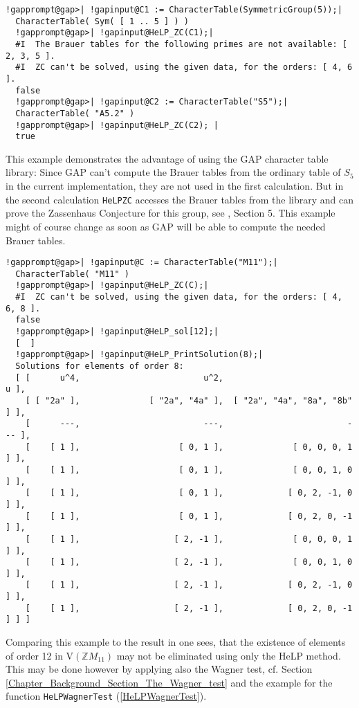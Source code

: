 \documentclass[a4paper,11pt]{report}
\begin{document}
{{\begin{Verbatim}[commandchars=!@|,fontsize=\small,frame=single,label=Example]
  !gapprompt@gap>| !gapinput@C1 := CharacterTable(SymmetricGroup(5));|
  CharacterTable( Sym( [ 1 .. 5 ] ) )
  !gapprompt@gap>| !gapinput@HeLP_ZC(C1);|
  #I  The Brauer tables for the following primes are not available: [ 2, 3, 5 ].
  #I  ZC can't be solved, using the given data, for the orders: [ 4, 6 ].
  false
  !gapprompt@gap>| !gapinput@C2 := CharacterTable("S5");|
  CharacterTable( "A5.2" )
  !gapprompt@gap>| !gapinput@HeLP_ZC(C2); |
  true
\end{Verbatim}
 This example demonstrates the advantage of using the GAP character table
library: Since GAP can't compute the Brauer tables from the ordinary table of $S_5$ in the current implementation, they are not used in the first calculation. But
in the second calculation \texttt{HeLP{\textunderscore}ZC} accesses the Brauer tables from the library and can prove the Zassenhaus
Conjecture for this group, see \cite{HertweckBrauer}, Section 5. This example might of course change as soon as GAP will be able
to compute the needed Brauer tables. 
\begin{Verbatim}[commandchars=!@|,fontsize=\small,frame=single,label=Example]
  !gapprompt@gap>| !gapinput@C := CharacterTable("M11");|
  CharacterTable( "M11" )
  !gapprompt@gap>| !gapinput@HeLP_ZC(C);|
  #I  ZC can't be solved, using the given data, for the orders: [ 4, 6, 8 ].
  false
  !gapprompt@gap>| !gapinput@HeLP_sol[12];|
  [  ]
  !gapprompt@gap>| !gapinput@HeLP_PrintSolution(8);|
  Solutions for elements of order 8:
  [ [      u^4,                         u^2,                           u ],
    [ [ "2a" ],              [ "2a", "4a" ],  [ "2a", "4a", "8a", "8b" ] ],
    [      ---,                         ---,                         --- ],
    [    [ 1 ],                    [ 0, 1 ],              [ 0, 0, 0, 1 ] ],
    [    [ 1 ],                    [ 0, 1 ],              [ 0, 0, 1, 0 ] ],
    [    [ 1 ],                    [ 0, 1 ],             [ 0, 2, -1, 0 ] ],
    [    [ 1 ],                    [ 0, 1 ],             [ 0, 2, 0, -1 ] ],
    [    [ 1 ],                   [ 2, -1 ],              [ 0, 0, 0, 1 ] ],
    [    [ 1 ],                   [ 2, -1 ],              [ 0, 0, 1, 0 ] ],
    [    [ 1 ],                   [ 2, -1 ],             [ 0, 2, -1, 0 ] ],
    [    [ 1 ],                   [ 2, -1 ],             [ 0, 2, 0, -1 ] ] ]
\end{Verbatim}
 Comparing this example to the result in \cite{KonovalovM11} one sees, that the existence of elements of order 12 in $\mathrm{V}(\mathbb{Z}M_{11})$ may not be eliminated using only the HeLP method. This may be done however by
applying also the Wagner test, cf. Section \ref{Chapter_Background_Section_The_Wagner_test} and the example for the function \texttt{HeLP{\textunderscore}WagnerTest} (\ref{HeLPWagnerTest}).

}}
\end{document}
